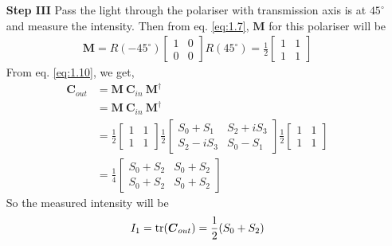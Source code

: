 \documentclass[11pt,a4paper]{article}
\numberwithin{equation}{section}
\begin{document}
\begin{enumerate}
\item[\textbf{Step III}] 
Pass the light through the polariser with transmission axis is at $45^\circ$ and measure the intensity. Then from eq. \ref{eq:1.7}, $\boldsymbol{M}$ for this polariser will be
\begin{align}
	\boldsymbol{M}= R(-45^\circ) \begin{bmatrix} 1 & 0 \\ 0 & 0 \end{bmatrix} R(45^\circ) =\frac{1}{2}\begin{bmatrix} 1 & 1 \\ 1 & 1 \end{bmatrix}
\end{align}
From eq. \ref{eq:1.10}, we get,
\begin{align}
	\boldsymbol{C}_{out} &= \boldsymbol{M}\:\boldsymbol{C}_{in}\:\boldsymbol{M}^\dagger\nonumber\\
	&= \boldsymbol{M}\:\boldsymbol{C}_{in}\:\boldsymbol{M}^\dagger\nonumber\\
	&=\frac{1}{2}\begin{bmatrix} 1 & 1 \\ 1 & 1 \end{bmatrix} 
	\frac{1}{2} \begin{bmatrix} S_0+S_1 & S_2+iS_3 \\ S_2-iS_3 & S_0-S_1\end{bmatrix}
	\frac{1}{2}\begin{bmatrix} 1 & 1 \\ 1 & 1 \end{bmatrix}\nonumber\\
	&= \frac{1}{4} \begin{bmatrix} S_0+S_2 & S_0+S_2 \\ S_0+S_2 & S_0+S_2\end{bmatrix}
\end{align}
So the measured intensity will be 
\begin{align}
	I_1 = \tr(\boldsymbol{C}_{out}) = \frac{1}{2} (S_0+S_2) \label{s III}
\end{align}
 

\end{enumerate}
\end{document}
